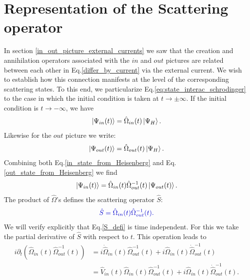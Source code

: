 \documentclass[
12pt, %
english, %
singlespacing, %
headsepline, %
]{MastersDoctoralThesis} %
\begin{document}
\section{Representation of the Scattering operator}\label{Connections}
In section \ref{in_out_picture_external_currents} we saw that the creation and annihilation operators associated with the $ in $ and $ out $ pictures are related between each other in Eq.\enskip\eqref{differ_by_current} via the external current. 
We wish to establish how this connection manifests at the level of the corresponding scattering states. To this end, we particularize Eq.\enskip\eqref{eq:state_interac_schrodinger} to the case in which the initial condition is taken at $ t \rightarrow \pm \infty $.
If the initial condition is $ t \rightarrow - \infty $, we have
\begin{equation}\label{in_state_from_Heisenberg}
\ket{\Psi_{in}(t)}=\hat{\Omega}_{in}(t)\ket{\Psi_{H}}.
\end{equation}
Likewise for the $ out $ picture we write:
\begin{equation}\label{out_state_from_Heisenberg}
\ket{\Psi_{out}(t)}=\hat{\Omega}_{out}(t)\ket{\Psi_{H}}.
\end{equation}
Combining both Eq.\enskip\eqref{in_state_from_Heisenberg} and Eq.\enskip\eqref{out_state_from_Heisenberg} we find
\begin{equation}\label{in_to_out_state}
\ket{\Psi_{in}(t)}=\hat{\Omega}_{in}(t)\hat{\Omega}^{-1}_{out}(t)\ket{\Psi_{out}(t)}.
\end{equation}
The product of $ \hat{\Omega} $'s defines the scattering operator $ \hat{S} $:%
\begin{equation}\label{S_defi}
\textcolor[RGB]{0,0,204}{
	\hat{S}=
	\hat{\Omega}_{in}(t)\hat{\Omega}^{-1}_{out}(t)
	.
}
\end{equation}
We will verify explicitly that Eq.\enskip\eqref{S_defi} is  time independent. For this we take the partial derivative of $ \hat{S} $ with respect to $ t $. This operation leads to
\begin{equation}\label{partial_t_for_indepen}
\begin{split}
i\partial_{t}
\left( \hat{\Omega}_{in}(t)\hat{\Omega}^{-1}_{out}(t) \right)
&= i\dot{\hat{\Omega}}_{in}(t)\hat{\Omega}^{-1}_{out}(t)
 	+ 
 		i\hat{\Omega}_{in}(t)\dot{\hat{\Omega}}^{-1}_{out}(t)
\\
&= \hat{V}_{in}(t)\hat{\Omega}_{in}(t)\hat{\Omega}^{-1}_{out}(t)
	+ 	
		i\hat{\Omega}_{in}(t)\dot{\hat{\Omega}}^{-1}_{out}(t)
.
\end{split}
\end{equation}
\end{document}
